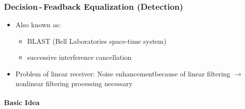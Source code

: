 \documentclass[a4paper, 10pt]{article}
\begin{document}
\subsubsection{Decision\,-\,Feadback Equalization (Detection)}
\begin{itemize}
	\item Also known as: 
	\begin{itemize}
		\item BLAST (Bell Laboratories space-time system)
		\item successive interference cancellation		
	\end{itemize}
	\item Problem of linear receiver: Noise enhancementbecause of linear filtering $\rightarrow$ nonlinear filtering processing necessary
\end{itemize}
\paragraph{Basic Idea}
\end{document}
